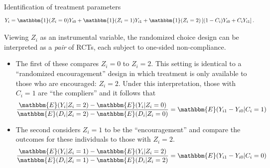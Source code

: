 \documentclass[8pt]{beamer}
\begin{document}
\begin{frame}{Identification of treatment parameters}
\label{identification_randomized_choice}
\begin{equation*}
    Y_i = \mathbbm{1}(Z_i =0) Y_{i0} + \mathbbm{1}(Z_i = 1)  Y_{i1}  + \mathbbm{1}(Z_i = 2) \left[(1 - C_i) Y_{i0} + C_i Y_{i1} \right].
\label{eq:potentialOutcomes}
\end{equation*}

    Viewing $Z_i$ as an instrumental variable, the randomized choice design can be interpreted as a \emph{pair} of RCTs, each subject to one-sided non-compliance. \\
    \begin{itemize}
        \item The first of these compares $Z_i=0$ to $Z_i = 2$.  This setting is identical to a ``randomized encouragement'' design in which treatment is only available to those who are encouraged: $Z_i = 2$. Under this interpretation, those with $C_i = 1$ are ``the compliers'' and it follows that 
\begin{equation*}
\frac{\mathbbm{E}(Y_i|Z_i=2) - \mathbbm{E}(Y_i|Z_i =0)}{\mathbbm{E}(D_i|Z_i=2)-\mathbbm{E}(D_i|Z_i=0)}  = \mathbbm{E}(Y_{i1} - Y_{i0}|C_i = 1)
\label{eq:ToT}
\end{equation*}

\item The second considers $Z_i = 1$ to be the ``encouragement'' and compare the outcomes for these individuals to those with $Z_i = 2$.
\begin{equation*}
\frac{\mathbbm{E}(Y_i|Z_i=1) - \mathbbm{E}(Y_i|Z_i =2)}{\mathbbm{E}(D_i|Z_i=1)-\mathbbm{E}(D_i|Z_i=2)}  = \mathbbm{E}(Y_{i1} - Y_{i0} | C_i = 0)
\label{eq:TuT}
\end{equation*}
    \end{itemize}

\hyperlink{rc_design}{}


\end{frame}
\end{document}

